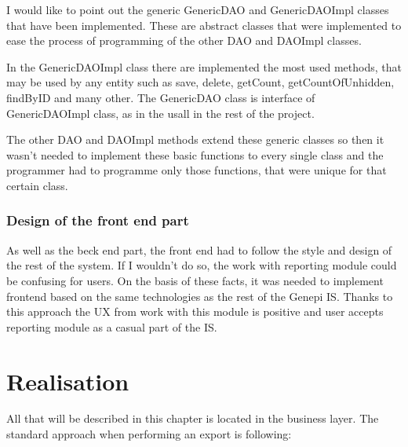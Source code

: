 \documentclass[thesis=B,english]{FITthesis}[2012/10/20]
\begin{document}
I would like to point out the generic GenericDAO and GenericDAOImpl classes that have been implemented.
These are abstract classes that were implemented to ease the process of programming of the other DAO and DAOImpl classes.

In the GenericDAOImpl class there are implemented the most used methods, that may be used by any entity such as save, delete, getCount, getCountOfUnhidden, findByID and many other. The GenericDAO class is interface of GenericDAOImpl class, as in the usall in the rest of the project.

The other DAO and DAOImpl methods extend these generic classes so then it wasn't needed to implement these basic functions to every single class and the programmer had to programme only those functions, that were unique for that certain class.

\subsection{Design of the front end part}
As well as the beck end part, the front end had to follow the style and design of the rest of the system. If I wouldn't do so, the work with reporting module could be confusing for users. On the basis of these facts, it was needed to implement frontend based on the same technologies as the rest of the Genepi IS. Thanks to this approach the UX from work with this module is positive and user accepts reporting module as a casual part of the IS.

\chapter{Realisation}
All that will be described in this chapter is located in the business layer. The standard approach when performing an export is following:
\end{document}
